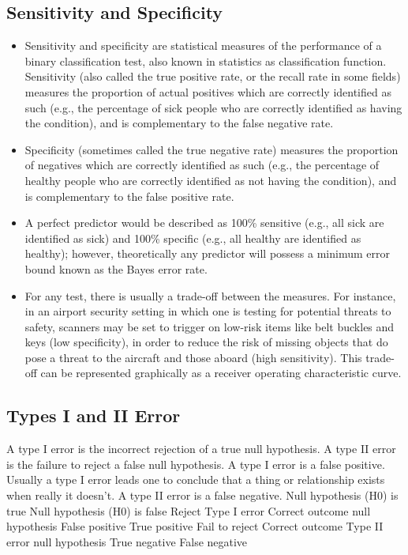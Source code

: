 \documentclass[a4paper,12pt]{article}
\begin{document}
\subsection{Sensitivity and Specificity}
\begin{itemize}
	\item Sensitivity and specificity are statistical measures of the performance of a binary classification test, also known in statistics as classification function. Sensitivity (also called the true positive rate, or the recall rate in some fields) measures the proportion of actual positives which are correctly identified as such (e.g., the percentage of sick people who are correctly identified as having the condition), and is complementary to the false negative rate.
	\item  Specificity (sometimes called the true negative rate) measures the proportion of negatives which are correctly identified as such (e.g., the percentage of healthy people who are correctly identified as not having the condition), and is complementary to the false positive rate.
\item A perfect predictor would be described as 100\% sensitive (e.g., all sick are identified as sick) and 100\% specific (e.g., all healthy are identified as healthy); however, theoretically any predictor will possess a minimum error bound known as the Bayes error rate.
\item For any test, there is usually a trade-off between the measures. For instance, in an airport security setting in which one is testing for potential threats to safety, scanners may be set to trigger on low-risk items like belt buckles and keys (low specificity), in order to reduce the risk of missing objects that do pose a threat to the aircraft and those aboard (high sensitivity). This trade-off can be represented graphically as a receiver operating characteristic curve.
	
\end{itemize}



\subsection*{Types I and II Error}
A type I error is the incorrect rejection of a true null hypothesis. A type
II error is the failure to reject a false null hypothesis. A type I error is a
false positive. Usually a type I error leads one to conclude that a thing or
relationship exists when really it doesn’t. A type II error is a false negative.
Null hypothesis (H0) is true Null hypothesis (H0) is false
Reject Type I error Correct outcome
null hypothesis False positive True positive
Fail to reject Correct outcome Type II error
null hypothesis True negative False negative
\end{document}
